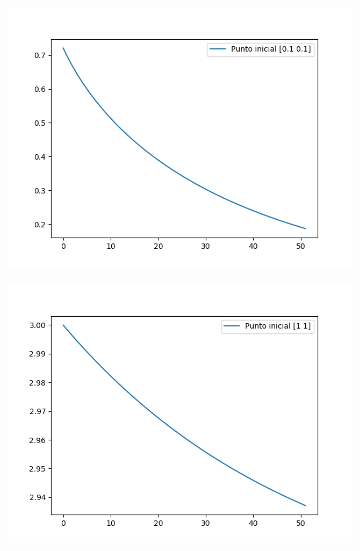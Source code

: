 \documentclass[12pt,a4paper]{article}
\begin{document}
\begin{figure}[H]
	\begin{subfigure}{0.24\textwidth}
		\centering
		\includegraphics[scale=0.3]{./Imagenes/bonus1.png}
	\end{subfigure}
	\begin{subfigure}{0.24\textwidth}
		\centering
		\includegraphics[scale=0.3]{./Imagenes/bonus2.png}
	\end{subfigure}
	\begin{subfigure}{0.24\textwidth}
		\centering

\end{subfigure}
\end{figure}
\end{document}
